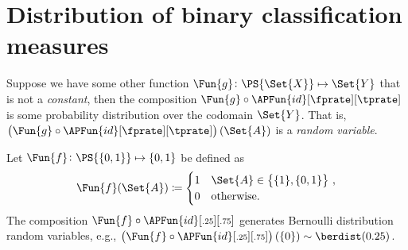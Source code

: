 \documentclass[ ../main.tex]{subfiles}
\begin{document}
\section{Distribution of binary classification measures}
\label{sec:perf}
Suppose we have some other function $\Fun{g} \colon \PS{\Set{X}} \mapsto \Set{Y}$ that is not a \emph{constant}, then the composition $\Fun{g} \circ \APFun{id}[\fprate][\tprate]$ is some probability distribution over the codomain $\Set{Y}$.
That is, $\left(\Fun{g} \circ \APFun{id}[\fprate][\tprate]\right)(\Set{A})$ is a \emph{random variable}.
\begin{example}
Let $\Fun{f} \colon \PS{\{0,1\}} \mapsto \{0,1\}$ be defined as
\begin{equation}
\Fun{f}(\Set{A}) \coloneqq
\begin{cases}
	1 & \Set{A} \in \left\{\{1\},\{0,1\}\right\}\,,\\
	0 & \text{otherwise.}
\end{cases}
\end{equation}
The composition $\Fun{f} \circ \APFun{id}[\mathsmaller{.25}][\mathsmaller{.75}]$ generates Bernoulli distribution random variables, e.g., $\left(\Fun{f} \circ \APFun{id}[\mathsmaller{.25}][\mathsmaller{.75}]\right)(\{0\}) \sim \berdist(0.25)$.

\end{example}
\end{document}
